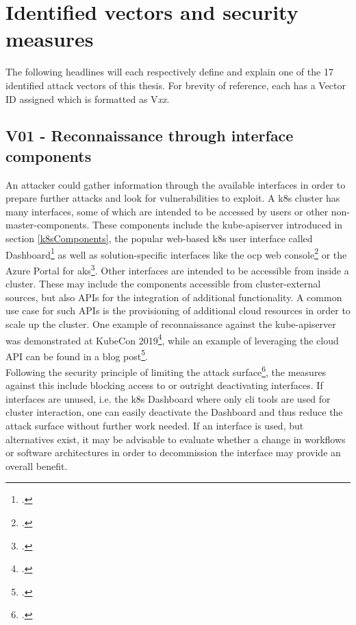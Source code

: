 \section{Identified vectors and security measures} \label{vectorIdentify}

The following headlines will each respectively define and explain one of the 17 identified attack vectors of this thesis. For brevity of reference, each has a Vector ID assigned which is formatted as V\textit{xx}.

\subsection{V01 - Reconnaissance through interface components} \label{v01}
An attacker could gather information through the available interfaces in order to prepare further attacks and look for vulnerabilities to exploit.
A \gls{k8s} cluster has many interfaces, some of which are intended to be accessed by users or other non-master-components. These components include the kube-apiserver introduced in section \ref{k8sComponents}, the popular web-based \gls{k8s} user interface called Dashboard\footcite[][, first paragraph]{k8sDashboard} as well as solution-specific interfaces like the \gls{ocp} web console\footcite[][, section 'Overview']{ocpWebConsole} or the Azure Portal for \gls{aks}\footcite[][, section 'Create an AKS cluster']{azurePortal}.
Other interfaces are intended to be accessible from inside a cluster. These may include the components accessible from cluster-external sources, but also APIs for the integration of additional functionality. A common use case for such APIs is the provisioning of additional cloud resources in order to scale up the cluster.
One example of reconnaissance against the kube-apiserver was demonstrated at KubeCon 2019\footcite[][, starting at 8:45]{lizReconDemo}, while an example of leveraging the cloud API can be found in a blog post\footcite{aksApiExploit}. \\
Following the security principle of limiting the attack surface\footcite[][, p. 4 to 5]{k8sBook}, the measures against this include blocking access to or outright deactivating interfaces. If interfaces are unused, i.e. the \gls{k8s} Dashboard where only \gls{cli} tools are used for cluster interaction, one can easily deactivate the Dashboard and thus reduce the attack surface without further work needed. If an interface is used, but alternatives exist, it may be advisable to evaluate whether a change in workflows or software architectures in order to decommission the interface may provide an overall benefit.
